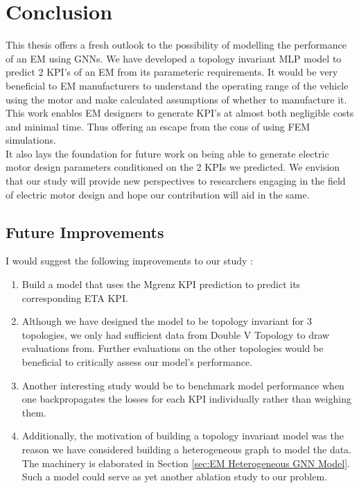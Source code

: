 \documentclass{report} %
\begin{document}
\newpage 

\chapter{Conclusion}

This thesis offers a fresh outlook to the possibility of modelling the performance of an \ac{EM} using \ac{GNN}s.
We have developed a topology invariant \ac{MLP} model to predict 2 \ac{KPI}'s of an \ac{EM} from its parameteric requirements. 
It would be very beneficial to \ac{EM} manufacturers to understand the operating range of the vehicle using the motor and make calculated assumptions of whether to manufacture it.\\
This work enables \ac{EM} designers to generate \ac{KPI}'s at almost both negligible costs and minimal time.
Thus offering an escape from the cons of using \ac{FEM} simulations.\\
It also lays the foundation for future work on being able to generate electric motor design parameters conditioned on the 2 KPIs we predicted.
We envision that our study will provide new perspectives to researchers engaging in the field of electric motor design and hope our contribution will aid in the same.\\
\section{Future Improvements}\label{sec:Future Improvements}

I would suggest the following improvements to our study : 

\begin{enumerate}
    \item Build a model that uses the Mgrenz \ac{KPI} prediction to predict its corresponding ETA \ac{KPI}. 
    \item Although we have designed the model to be topology invariant for 3 topologies, we only had sufficient data from Double V Topology to draw evaluations from.
    Further evaluations on the other topologies would be beneficial to critically assess our model's performance.
    \item Another interesting study would be to benchmark model performance when one backpropagates the losses for each \ac{KPI} individually rather than weighing them.
    \item Additionally, the motivation of building a topology invariant model was the reason we have considered building a heterogeneous graph to model the data. The machinery is elaborated in Section \ref{sec:EM Heterogeneous GNN Model}.
    Such a model could serve as yet another ablation study to our problem.
\end{enumerate}
\end{document}
